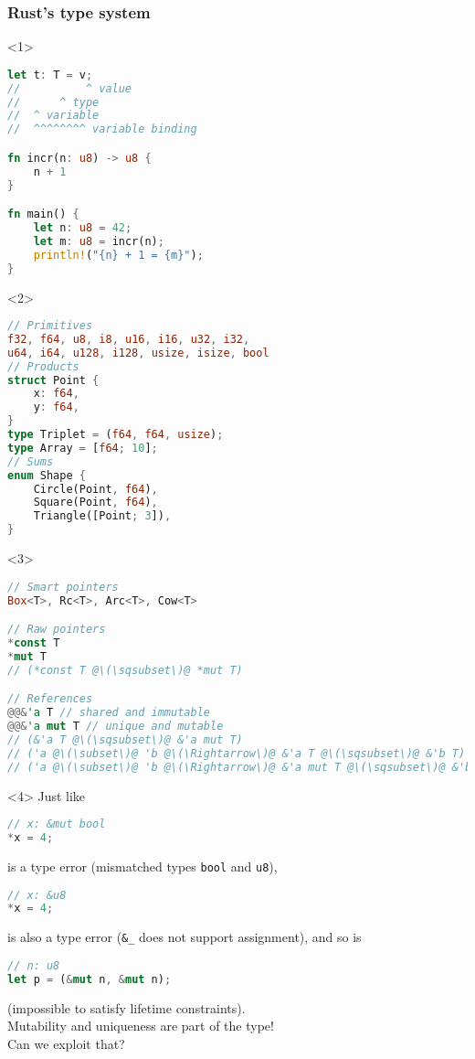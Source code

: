 \begin{frame}[fragile]
    \frametitle{Rust's type system}
    \begin{onlyenv}<1>
        \begin{lstlisting}[language=rust]
let t: T = v;
//          ^ value
//      ^ type
//  ^ variable
//  ^^^^^^^^ variable binding

fn incr(n: u8) -> u8 {
    n + 1
}

fn main() {
    let n: u8 = 42;
    let m: u8 = incr(n);
    println!("{n} + 1 = {m}");
}
        \end{lstlisting}
    \end{onlyenv}

    \begin{onlyenv}<2>
        \begin{lstlisting}[language=rust]
// Primitives
f32, f64, u8, i8, u16, i16, u32, i32,
u64, i64, u128, i128, usize, isize, bool
// Products
struct Point {
    x: f64,
    y: f64,
}
type Triplet = (f64, f64, usize);
type Array = [f64; 10];
// Sums
enum Shape {
    Circle(Point, f64),
    Square(Point, f64),
    Triangle([Point; 3]),
}
        \end{lstlisting}
    \end{onlyenv}

    \begin{onlyenv}<3>
        \begin{lstlisting}[language=rust, escapechar=@]
// Smart pointers
Box<T>, Rc<T>, Arc<T>, Cow<T>

// Raw pointers
*const T
*mut T
// (*const T @\(\sqsubset\)@ *mut T)

// References
@@&'a T // shared and immutable
@@&'a mut T // unique and mutable
// (&'a T @\(\sqsubset\)@ &'a mut T)
// ('a @\(\subset\)@ 'b @\(\Rightarrow\)@ &'a T @\(\sqsubset\)@ &'b T)
// ('a @\(\subset\)@ 'b @\(\Rightarrow\)@ &'a mut T @\(\sqsubset\)@ &'b mut T)
        \end{lstlisting}
    \end{onlyenv}

    \begin{onlyenv}<4>
        Just like
        \begin{lstlisting}[language=rust]
// x: &mut bool
*x = 4;
        \end{lstlisting}
        is a type error (mismatched types \texttt{bool} and \texttt{u8}),
        \begin{lstlisting}[language=rust]
// x: &u8
*x = 4;
        \end{lstlisting}
        is also a type error (\texttt{\&\_} does not support assignment),
        and so is
        \begin{lstlisting}[language=rust]
// n: u8
let p = (&mut n, &mut n);
        \end{lstlisting}
        (impossible to satisfy lifetime constraints).\\

        Mutability and uniqueness are part of the type!\\
        Can we exploit that?
    \end{onlyenv}

\end{frame}

